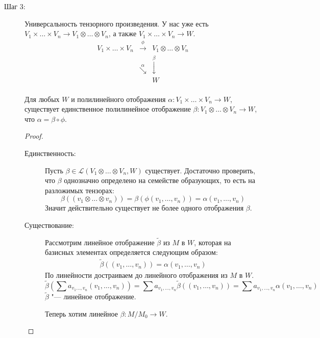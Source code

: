 \begin{description}
\item[Шаг 3:] Универсальность тензорного произведения.
	У нас уже есть $V_1 \times \dots \times V_n \to V_1 \otimes \dots \otimes V_n$, а также $V_1 \times \dots \times V_n \to W$.
	$$
        \begin{matrix}
        V_1 \times \dots \times V_n  & \overset{\phi}{\rightarrow}& V_1 \otimes \dots \otimes V_n\\
        &\overset{\alpha}{\searrow}&\overset{\beta}{\downarrow}\\
        &&W\\
        \end{matrix}
        $$
	\begin{theorem}
		Для любых $W$ и полилинейного отображения $\alpha \colon V_1 \times \dots \times V_n \to W$,
		существует единственное полилинейное отображение $\beta \colon V_1 \otimes \dots \otimes V_n \to W$,
		что $\alpha = \beta \circ \phi$.
	\end{theorem}
	\begin{proof}
	\begin{description}
	\item[Единственность:] \hfill
		Пусть $\beta \in \mathscr{L}(V_1 \otimes \dots \otimes V_n, W)$  существует.
		Достаточно проверить, что $\beta$ однозначно определено на семействе образующих, то есть на разложимых тензорах:
		\[ \beta((v_1\otimes \dots \otimes v_n)) = \beta (\phi(v_1, \dots, v_n)) = \alpha (v_1, \dots, v_n) \]
		Значит действительно существует не более одного отображения $\beta$.

	\item[Существование:]
		Рассмотрим линейное отображение $\tilde \beta$ из $M$ в $W$, которая на базисных элементах 
		определяется следующим образом:
		\begin{gather*}
			\tilde \beta((v_1, \dots, v_n)) = \alpha(v_1, \dots, v_n)
		\end{gather*}
		По линейности достраиваем до линейного отображения из $M$ в $W$.
		\[ \tilde \beta\left(\sum a_{v_1 \dots, v_n}(v_1, \dots, v_n)\right) = \sum a_{v_1, \dots, v_n} \tilde \beta((v_1, \dots, v_n)) = \sum a_{v_1, \dots, v_n} \alpha(v_1, \dots, v_n) \]
		$\tilde \beta$ "--- линейное отображение.
		
		Теперь хотим линейное $\beta\colon M/M_0 \to W$.
		

\end{description}
\end{proof}
\end{description}
